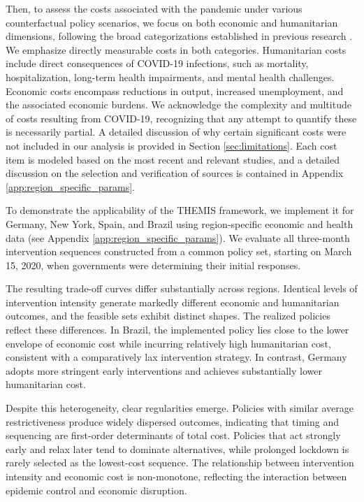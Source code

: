 \documentclass[msom,blindrev]{informs3} %
\newcommand{\rev}[1]{{\color{blue}#1}}
\begin{document}
Then, to assess the costs associated with the pandemic under various counterfactual policy scenarios, we focus on both economic and humanitarian dimensions, following the broad categorizations established in previous research . We emphasize directly measurable costs in both categories. Humanitarian costs include direct consequences of COVID-19 infections, such as mortality, hospitalization, long-term health impairments, and mental health challenges. Economic costs encompass reductions in output, increased unemployment, and the associated economic burdens. \rev{We acknowledge the complexity and multitude of costs resulting from COVID-19, recognizing that any attempt to quantify these is necessarily partial. A detailed discussion of why certain significant costs were not included in our analysis is provided in Section \ref{sec:limitations}.} Each cost item is modeled based on the most recent and relevant studies, and a detailed discussion on the selection and verification of sources is contained in Appendix \ref{app:region_specific_params}.

To demonstrate the applicability of the THEMIS framework, we implement it for Germany, New York, Spain, and Brazil using region-specific economic and health data (see Appendix \ref{app:region_specific_params}). We evaluate all three-month intervention sequences constructed from a common policy set, starting on March 15, 2020, when governments were determining their initial responses.

The resulting trade-off curves differ substantially across regions. Identical levels of intervention intensity generate markedly different economic and humanitarian outcomes, and the feasible sets exhibit distinct shapes. The realized policies reflect these differences. In Brazil, the implemented policy lies close to the lower envelope of economic cost while incurring relatively high humanitarian cost, consistent with a comparatively lax intervention strategy. In contrast, Germany adopts more stringent early interventions and achieves substantially lower humanitarian cost.

Despite this heterogeneity, clear regularities emerge. Policies with similar average restrictiveness produce widely dispersed outcomes, indicating that timing and sequencing are first-order determinants of total cost. Policies that act strongly early and relax later tend to dominate alternatives, while prolonged lockdown is rarely selected as the lowest-cost sequence. The relationship between intervention intensity and economic cost is non-monotone, reflecting the interaction between epidemic control and economic disruption.
\end{document}
